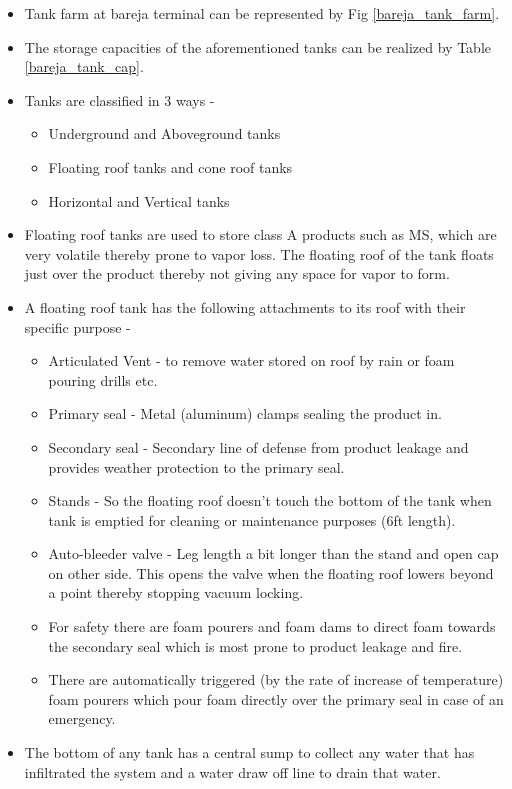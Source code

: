 \documentclass{report}
\begin{document}
	\begin{itemize}
		\item Tank farm at bareja terminal can be represented by Fig \ref{bareja_tank_farm}.
		\item The storage capacities of the aforementioned tanks can be realized by Table \ref{bareja_tank_cap}.
		\item Tanks are classified in 3 ways - 
		\begin{itemize}
			\item Underground and Aboveground tanks
			\item Floating roof tanks and cone roof tanks
			\item Horizontal and Vertical tanks
		\end{itemize}
		\item Floating roof tanks are used to store class A products such as MS, which are very volatile thereby prone to vapor loss. The floating roof of the tank floats just over the product thereby not giving any space for vapor to form.
		\item A floating roof tank has the following attachments to its roof with their specific purpose -
		\begin{itemize}
			\item Articulated Vent - to remove water stored on roof by rain or foam pouring drills etc.
			\item Primary seal - Metal (aluminum) clamps sealing the product in.
			\item Secondary seal - Secondary line of defense from product leakage and provides weather protection to the primary seal.
			\item Stands - So the floating roof doesn't touch the bottom of the tank when tank is emptied for cleaning or maintenance purposes (6ft length).
			\item Auto-bleeder valve - Leg length a bit longer than the stand and open cap on other side. This opens the valve when the floating roof lowers beyond a point thereby stopping vacuum locking.  
			\item For safety there are foam pourers and foam dams to direct foam towards the secondary seal which is most prone to product leakage and fire.
			\item There are automatically triggered (by the rate of increase of temperature) foam pourers which pour foam directly over the primary seal in case of an emergency.
		\end{itemize}
		\item The bottom of any tank has a central sump to collect any water that has infiltrated the system and a water draw off line to drain that water.

\end{itemize}
\end{document}
